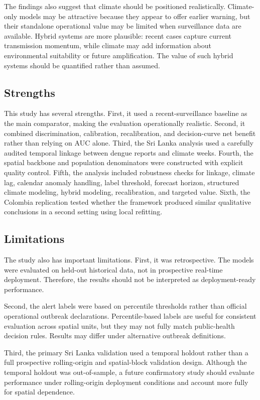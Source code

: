 \documentclass[11pt,a4paper]{article}
\begin{document}
The findings also suggest that climate should be positioned realistically. Climate-only models may be attractive because they appear to offer earlier warning, but their standalone operational value may be limited when surveillance data are available. Hybrid systems are more plausible: recent cases capture current transmission momentum, while climate may add information about environmental suitability or future amplification. The value of such hybrid systems should be quantified rather than assumed.

\subsection{Strengths}
\label{subsec:strengths}

This study has several strengths. First, it used a recent-surveillance baseline as the main comparator, making the evaluation operationally realistic. Second, it combined discrimination, calibration, recalibration, and decision-curve net benefit rather than relying on AUC alone. Third, the Sri Lanka analysis used a carefully audited temporal linkage between dengue reports and climate weeks. Fourth, the spatial backbone and population denominators were constructed with explicit quality control. Fifth, the analysis included robustness checks for linkage, climate lag, calendar anomaly handling, label threshold, forecast horizon, structured climate modeling, hybrid modeling, recalibration, and targeted value. Sixth, the Colombia replication tested whether the framework produced similar qualitative conclusions in a second setting using local refitting.

\subsection{Limitations}
\label{subsec:limitations}

The study also has important limitations. First, it was retrospective. The models were evaluated on held-out historical data, not in prospective real-time deployment. Therefore, the results should not be interpreted as deployment-ready performance.

Second, the alert labels were based on percentile thresholds rather than official operational outbreak declarations. Percentile-based labels are useful for consistent evaluation across spatial units, but they may not fully match public-health decision rules. Results may differ under alternative outbreak definitions.

Third, the primary Sri Lanka validation used a temporal holdout rather than a full prospective rolling-origin and spatial-block validation design. Although the temporal holdout was out-of-sample, a future confirmatory study should evaluate performance under rolling-origin deployment conditions and account more fully for spatial dependence.
\end{document}
